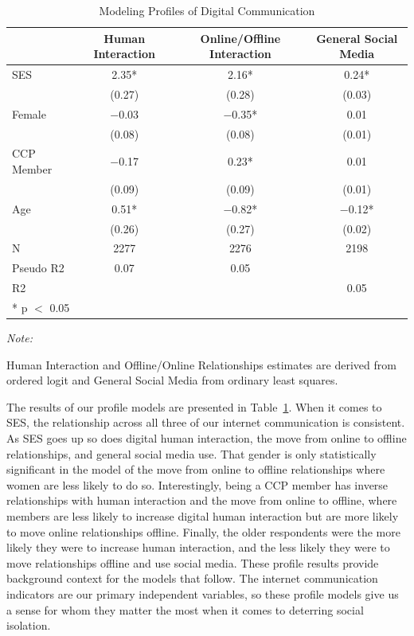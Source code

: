 \documentclass[]{interact}
\theoremstyle{plain}%
\theoremstyle{definition}
\theoremstyle{remark}
\begin{document}
\hypertarget{tbl-profile-models}{}
\begin{table}
\caption{\label{tbl-profile-models}Modeling Profiles of Digital Communication }\tabularnewline

\centering
\begin{threeparttable}
\begin{tabular}[t]{lccc}
\toprule
  & Human Interaction & Online/Offline Interaction & General Social Media\\
\midrule
SES & \num{2.35}* & \num{2.16}* & \num{0.24}*\\
 & (\num{0.27}) & (\num{0.28}) & (\num{0.03})\\
Female & \num{-0.03} & \num{-0.35}* & \num{0.01}\\
 & (\num{0.08}) & (\num{0.08}) & (\num{0.01})\\
CCP Member & \num{-0.17} & \num{0.23}* & \num{0.01}\\
 & (\num{0.09}) & (\num{0.09}) & (\num{0.01})\\
Age & \num{0.51}* & \num{-0.82}* & \num{-0.12}*\\
 & (\num{0.26}) & (\num{0.27}) & (\num{0.02})\\
\midrule
N & \num{2277} & \num{2276} & \num{2198}\\
Pseudo R2 & \num{0.07} & \num{0.05} & \\
R2 &  &  & \num{0.05}\\
\bottomrule
\multicolumn{4}{l}{\rule{0pt}{1em}* p $<$ 0.05}\\
\end{tabular}
\begin{tablenotes}
\item \textit{Note: } 
\item Human Interaction and Offline/Online Relationships estimates are derived from ordered logit and General Social Media from ordinary least squares.
\end{tablenotes}
\end{threeparttable}
\end{table}

The results of our profile models are presented in
Table~\ref{tbl-profile-models}. When it comes to SES, the relationship
across all three of our internet communication is consistent. As SES
goes up so does digital human interaction, the move from online to
offline relationships, and general social media use. That gender is only
statistically significant in the model of the move from online to
offline relationships where women are less likely to do so.
Interestingly, being a CCP member has inverse relationships with human
interaction and the move from online to offline, where members are less
likely to increase digital human interaction but are more likely to move
online relationships offline. Finally, the older respondents were the
more likely they were to increase human interaction, and the less likely
they were to move relationships offline and use social media. These
profile results provide background context for the models that follow.
The internet communication indicators are our primary independent
variables, so these profile models give us a sense for whom they matter
the most when it comes to deterring social isolation.
\end{document}
